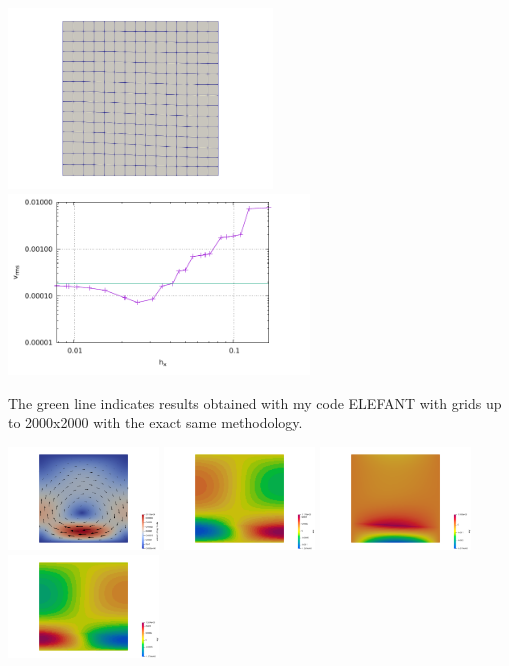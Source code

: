 \begin{center}
\includegraphics[width=7cm]{python_codes/fieldstone_RTinstability1/images/grid}
\includegraphics[width=8cm]{python_codes/fieldstone_RTinstability1/images/vrms.pdf}
\end{center}
The green line indicates results obtained with my code ELEFANT with grids up to 2000x2000
with the exact same methodology.

\begin{center}
\includegraphics[width=4cm]{python_codes/fieldstone_RTinstability1/images/vel_128}
\includegraphics[width=4cm]{python_codes/fieldstone_RTinstability1/images/exx_128}
\includegraphics[width=4cm]{python_codes/fieldstone_RTinstability1/images/exy_128}
\includegraphics[width=4cm]{python_codes/fieldstone_RTinstability1/images/eyy_128}
\end{center}







